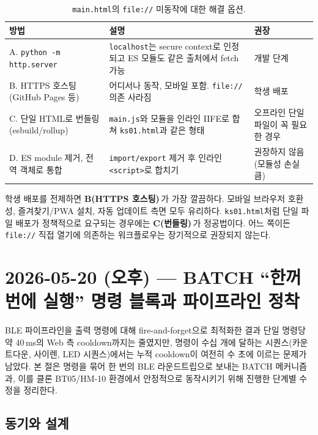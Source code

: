 \documentclass[11pt, oneside]{article}
\begin{document}
\begin{table}[h]
\centering
\small
\begin{tabularx}{\linewidth}{@{}lXl@{}}
\toprule
방법 & 설명 & 권장 \\
\midrule
A. \texttt{python -m http.server} & \texttt{localhost}는 secure context로 인정되고 ES 모듈도 같은 출처에서 fetch 가능 & 개발 단계 \\
B. HTTPS 호스팅 (GitHub Pages 등) & 어디서나 동작, 모바일 포함. \texttt{file://} 의존 사라짐 & 학생 배포 \\
C. 단일 HTML로 번들링(esbuild/rollup) & \texttt{main.js}와 모듈을 인라인 IIFE로 합쳐 \texttt{ks01.html}과 같은 형태 & 오프라인 단일 파일이 꼭 필요한 경우 \\
D. ES module 제거, 전역 객체로 통합 & \texttt{import/export} 제거 후 인라인 \texttt{<script>}로 합치기 & 권장하지 않음 (모듈성 손실 큼) \\
\bottomrule
\end{tabularx}
\caption{\texttt{main.html}의 \texttt{file://} 미동작에 대한 해결 옵션.}
\end{table}

\begin{keypoint}
학생 배포를 전제하면 \textbf{B(HTTPS 호스팅)}\,가 가장 깔끔하다. 모바일
브라우저 호환성, 즐겨찾기/PWA 설치, 자동 업데이트 측면 모두 유리하다.
\texttt{ks01.html}처럼 단일 파일 배포가 정책적으로 요구되는 경우에는
\textbf{C(번들링)}\,가 정공법이다. 어느 쪽이든 \texttt{file://} 직접
열기에 의존하는 워크플로우는 장기적으로 권장되지 않는다.
\end{keypoint}

\section{2026-05-20 (오후) --- BATCH ``한꺼번에 실행'' 명령 블록과 파이프라인 정착}

BLE 파이프라인을 출력 명령에 대해 fire-and-forget으로 최적화한 결과
단일 명령당 약 40\,ms의 Web 측 cooldown까지는 줄였지만, 명령이 수십 개에
달하는 시퀀스(카운트다운, 사이렌, LED 시퀀스)에서는 누적 cooldown이
여전히 수 초에 이르는 문제가 남았다. 본 절은 명령을 묶어 한 번의 BLE
라운드트립으로 보내는 BATCH 메커니즘과, 이를 클론 BT05/HM-10 환경에서
안정적으로 동작시키기 위해 진행한 단계별 수정을 정리한다.

\subsection{동기와 설계}
\end{document}
